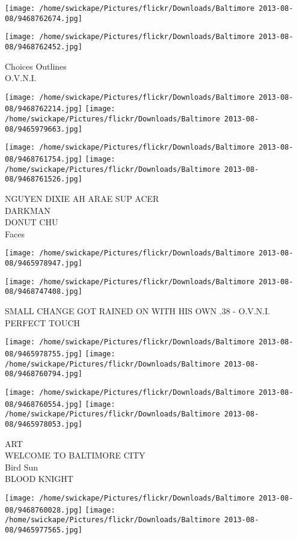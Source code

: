 \documentclass[10pt,letterpaper]{article}
\begin{document}
\texttt{[image: /home/swickape/Pictures/flickr/Downloads/Baltimore 2013-08-08/9468762674.jpg]}

\vspace{0.25in}
\texttt{[image: /home/swickape/Pictures/flickr/Downloads/Baltimore 2013-08-08/9468762452.jpg]}

Choices Outlines\\
O.V.N.I.
\pagebreak

\texttt{[image: /home/swickape/Pictures/flickr/Downloads/Baltimore 2013-08-08/9468762214.jpg]}
\texttt{[image: /home/swickape/Pictures/flickr/Downloads/Baltimore 2013-08-08/9465979663.jpg]}

\texttt{[image: /home/swickape/Pictures/flickr/Downloads/Baltimore 2013-08-08/9468761754.jpg]}
\texttt{[image: /home/swickape/Pictures/flickr/Downloads/Baltimore 2013-08-08/9468761526.jpg]}

NGUYEN DIXIE AH ARAE SUP ACER\\
DARKMAN\\
DONUT CHU\\
Faces
\pagebreak

\texttt{[image: /home/swickape/Pictures/flickr/Downloads/Baltimore 2013-08-08/9465978947.jpg]}

\vspace{0.25in}
\texttt{[image: /home/swickape/Pictures/flickr/Downloads/Baltimore 2013-08-08/9468747408.jpg]}

SMALL CHANGE GOT RAINED ON WITH HIS OWN .38 {-} O.V.N.I.\\
PERFECT TOUCH
\pagebreak

\texttt{[image: /home/swickape/Pictures/flickr/Downloads/Baltimore 2013-08-08/9465978755.jpg]}
\texttt{[image: /home/swickape/Pictures/flickr/Downloads/Baltimore 2013-08-08/9468760794.jpg]}

\texttt{[image: /home/swickape/Pictures/flickr/Downloads/Baltimore 2013-08-08/9468760554.jpg]}
\texttt{[image: /home/swickape/Pictures/flickr/Downloads/Baltimore 2013-08-08/9465978053.jpg]}

ART\\
WELCOME TO BALTIMORE CITY\\
Bird Sun\\
BLOOD KNIGHT
\pagebreak

\texttt{[image: /home/swickape/Pictures/flickr/Downloads/Baltimore 2013-08-08/9468760028.jpg]}
\texttt{[image: /home/swickape/Pictures/flickr/Downloads/Baltimore 2013-08-08/9465977565.jpg]}
\end{document}
